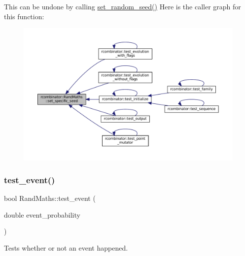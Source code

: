 This can be undone by calling {\ttfamily \mbox{\hyperlink{classrcombinator_1_1RandMaths_a2b61e31de6067ffa35531d5bde40f4c6}{set\+\_\+random\+\_\+seed()}}} Here is the caller graph for this function\+:
\nopagebreak
\begin{figure}[H]
\begin{center}
\leavevmode
\includegraphics[width=350pt]{classrcombinator_1_1RandMaths_a0bf1c2e7a1eccb1f9246b3fceeb5db8a_icgraph}
\end{center}
\end{figure}
\mbox{\label{classrcombinator_1_1RandMaths_a183686140a9da18ad40c7e048ee8914e}} 
\subsubsection{\texorpdfstring{test\+\_\+event()}{test\_event()}}
{\footnotesize\ttfamily bool Rand\+Maths\+::test\+\_\+event (\begin{DoxyParamCaption}\item[{double}]{event\+\_\+probability }\end{DoxyParamCaption})}



Tests whether or not an event happened. 

